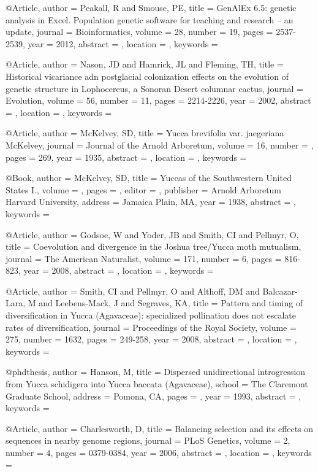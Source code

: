 @Article{,
author = {Peakall, R and Smouse, PE}, 
title = {GenAlEx 6.5: genetic analysis in Excel. Population genetic software for teaching and research -- an update}, 
journal = {Bioinformatics}, 
volume = {28}, 
number = {19}, 
pages = {2537-2539}, 
year = {2012}, 
abstract = {}, 
location = {}, 
keywords = {}}


@Article{,
author = {Nason, JD and Hamrick, JL and Fleming, TH}, 
title = {Historical vicariance adn postglacial colonization effects on the evolution of genetic structure in Lophocereus, a Sonoran Desert columnar cactus}, 
journal = {Evolution}, 
volume = {56}, 
number = {11}, 
pages = {2214-2226}, 
year = {2002}, 
abstract = {}, 
location = {}, 
keywords = {}}


@Article{,
author = {McKelvey, SD}, 
title = {Yucca brevifolia var. jaegeriana McKelvey}, 
journal = {Journal of the Arnold Arboretum}, 
volume = {16}, 
number = {}, 
pages = {269}, 
year = {1935}, 
abstract = {}, 
location = {}, 
keywords = {}}


@Book{,
author = {McKelvey, SD}, 
title = {Yuccas of the Southwestern United States I.}, 
volume = {}, 
pages = {}, 
editor = {}, 
publisher = {Arnold Arboretum Harvard University}, 
address = {Jamaica Plain, MA}, 
year = {1938}, 
abstract = {}, 
keywords = {}}

@Article{,
author = {Godsoe, W and Yoder, JB and Smith, CI and Pellmyr, O}, 
title = {Coevolution and divergence in the Joshua tree/Yucca moth mutualism}, 
journal = {The American Naturalist}, 
volume = {171}, 
number = {6}, 
pages = {816-823}, 
year = {2008}, 
abstract = {}, 
location = {}, 
keywords = {}}


@Article{,
author = {Smith, CI and Pellmyr, O and Althoff, DM and Balcazar-Lara, M and Leebens-Mack, J and Segraves, KA}, 
title = {Pattern and timing of diversification in Yucca (Agavaceae): specialized pollination does not escalate rates of diversification}, 
journal = {Proceedings of the Royal Society}, 
volume = {275}, 
number = {1632}, 
pages = {249-258}, 
year = {2008}, 
abstract = {}, 
location = {}, 
keywords = {}}


@phdthesis{,
author = {Hanson, M}, 
title = {Dispersed unidirectional introgression from Yucca schidigera into Yucca baccata (Agavaceae)}, 
school = {The Claremont Graduate School}, 
address = {Pomona, CA}, 
pages = {}, 
year = {1993}, 
abstract = {}, 
keywords = {}}

@Article{,
author = {Charlesworth, D}, 
title = {Balancing selection and its effects on sequences in nearby genome regions}, 
journal = {PLoS Genetics}, 
volume = {2}, 
number = {4}, 
pages = {0379-0384}, 
year = {2006}, 
abstract = {}, 
location = {}, 
keywords = {}}


